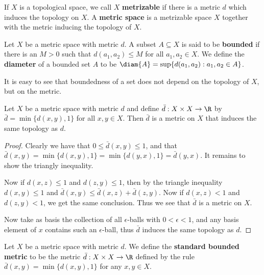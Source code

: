 \begin{definition}
    If $X$ is a topological space, we call  $X$ \textbf {metrizable} if there is a metric $d$ which
    induces the topology on $X$. A \textbf {metric space} is a metrizable space $X$ together with
    the metric inducing the topology of $X$.
\end{definition}

\begin{definition}
    Let $X$ be a metric space with metric $d$. A subset $A \subseteq X$ is said to be \textbf
    {bounded} if there is an $M>0$ such that $d(a_1,a_2) \leq M$ for all $ a_1,a_2 \in X$. We define
    the \textbf{diameter} of a bounded set $A$ to be $\diam{A}=\sup\{d(a_1,a_2):a_1,a_2 \in A\}$.
\end{definition}

It is easy to see that boundedness of a set does not depend on the topology of $X$, but on the
metric.

\begin{theorem}\label{2.2.3}
    Let $X$ be a metric space with metric $d$ and define  $\bar{d}:X \times X \rightarrow \R$ by
    $\bar{d}=\min\{d(x,y),1\}$ for all $x,y \in X$. Then  $\bar{d}$ is a metric on $X$ that induces
    the same topology as  $d$.
\end{theorem}
\begin{proof}
    Clearly we have that $0 \leq \bar{d}(x,y) \leq 1$, and that
    $\bar{d}(x,y)=\min\{d(x,y),1\}=\min\{d(y,x),1\}=\bar{d}(y,x)$. It remains to show the triangly
    inequality.

    Now if $d(x,z) \leq 1$ and $d(z,y) \leq 1$, then by the triangle inequality $d(x,y) \leq 1$ and
    $\bar{d}(x,y) \leq \bar{d}(x,z)+\bar{d}(z,y)$. Now if $d(x,z)<1$ and $d(z,y)<1$, we get the same
    conclusion. Thus we see that $\bar{d}$ is a metric on $X$.

    Now take as basis the collection of all  $\epsilon$-balls with  $0<\epsilon<1$, and any basis
    element of  $x$ contains such an  $\epsilon$-ball, thus  $\bar{d}$ induces the same topology as
    $d$.
\end{proof}

\begin{definition}
    Let $X$ be a metric space with metric  $d$. We define the \textbf{standard
    bounded metric} to be the metric $\bar{d}:X \times X \rightarrow \R$ defined
    by the rule $\bar{d}(x,y) = \min\{d(x,y), 1\}$ for any $x,y \in X$.
\end{definition}

